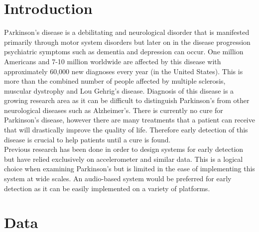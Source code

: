 \documentclass[twoside]{article}
\begin{document}
\begin{multicols}{2} %

\section{Introduction}

\lettrine[nindent=0em,lines=3]{P} arkinson's disease is a debilitating and neurological disorder that is manifested primarily
through motor system disorders but later on in the disease progression psychiatric symptoms such as
dementia and depression can occur. One million Americans and 7-10 million worldwide are affected by
this disease with approximately 60,000 new diagnoses every year (in the United States). This is more
than the combined number of people affected by multiple sclerosis, muscular dystrophy and Lou
Gehrig's disease. Diagnosis of this disease is a growing research area as it can be difficult to distinguish
Parkinson's from other neurological diseases such as Alzheimer's.
There is currently no cure for Parkinson's disease, however there are many treatments that a patient can receive
that will drastically improve the quality of life. Therefore early detection of this disease is crucial to
help patients until a cure is found.\\
Previous research has been done in order to design systems for early detection but have relied exclusively 
on accelerometer and similar data. This is a logical choice when examining Parkinson's but is limited
in the ease of implementing this system at wide scales. An audio-based system would be preferred for early
detection as it can be easily implemented on a variety of platforms.

\section{Data}


\end{multicols}
\end{document}
